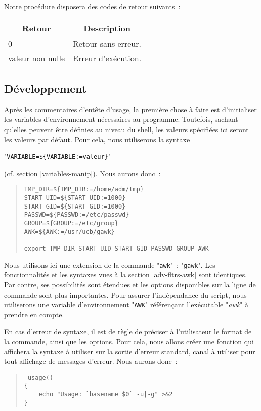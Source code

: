 Notre proc{\'e}dure disposera des codes de retour suivants~:
\begin{center}
\begin{tabular}{|l|p{3cm}|}
	\hline
		\multicolumn{1}{|c|}{Retour}		&
		\multicolumn{1}{|c|}{Description}	\\
	\hline \hline
		0					&	Retour sans erreur.	\\
		valeur non nulle	&	Erreur d'ex{\'e}cution.	\\
	\hline
\end{tabular}
\end{center}

\subsection{D{\'e}veloppement}

Apr{\`e}s les commentaires d'ent{\^e}te d'usage, la premi{\`e}re chose
{\`a} faire est d'initia\-liser les variables d'environnement
n{\'e}cessaires au programme. Toutefois, sachant qu'elles peuvent
{\^e}tre d{\'e}finies au niveau du shell, les valeurs sp{\'e}cifi{\'e}es
ici seront les valeurs par d{\'e}faut. Pour cela, nous utiliserons la
syntaxe
\begin{center}
"\verb,VARIABLE=${VARIABLE:=valeur},"
\end{center}
 (cf. section \ref{variables-manip}). Nous aurons donc~:
\begin{quote}
\begin{verbatim}
TMP_DIR=${TMP_DIR:=/home/adm/tmp}
START_UID=${START_UID:=1000}
START_GID=${START_GID:=1000}
PASSWD=${PASSWD:=/etc/passwd}
GROUP=${GROUP:=/etc/group}
AWK=${AWK:=/usr/ucb/gawk}

export TMP_DIR START_UID START_GID PASSWD GROUP AWK
\end{verbatim}
\end{quote}

\begin{remarque}
Nous utilisons ici une extension de la commande "{\tt awk}"~: "{\tt gawk}".
Les fonctionnalit{\'e}s et les syntaxes vues {\`a} la section \ref{adv-fltrs-awk} sont
identiques. Par contre, ses possibilit{\'e}s sont {\'e}tendues et les options disponibles
sur la ligne de commande sont plus importantes. Pour assurer l'ind{\'e}pendance du
script, nous utiliserons une variable d'environnement "{\tt AWK}" r{\'e}f{\'e}ren\c{c}ant
l'ex{\'e}cutable "{\sl awk}" {\`a} prendre en compte.
\end{remarque}

En cas d'erreur de syntaxe, il est de r{\`e}gle de pr{\'e}ciser {\`a} l'utilisateur
le format de la commande, ainsi que les options. Pour cela, nous allons cr{\'e}er
une fonction qui affichera la syntaxe {\`a} utiliser sur la sortie d'erreur standard,
canal {\`a} utiliser pour tout affichage de messages d'erreur. Nous aurons donc~:
\begin{quote}
\begin{verbatim}
_usage()
{
    echo "Usage: `basename $0` -u|-g" >&2
}
\end{verbatim}
\end{quote}

